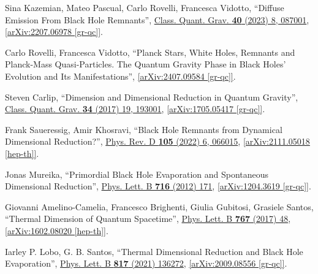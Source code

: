 \documentclass[12pt,preprintnumbers, floatfix, preprintnumbers, letterpaper, superscriptaddress,nofootinbib]{revtex4-2}
\begin{document}
\begin{thebibliography}{99}
Sina Kazemian, Mateo Pascual, Carlo Rovelli, Francesca Vidotto, ``Diffuse Emission From Black Hole Remnants'', {\hypersetup{urlcolor=vividviolet}\href{https://iopscience.iop.org/article/10.1088/1361-6382/acc232}{Class. Quant. Grav. \textbf{40} (2023) 8, 087001}}, \href{https://arxiv.org/abs/2207.06978}{[arXiv:2207.06978 [gr-qc]]}.

Carlo Rovelli, Francesca Vidotto, ``Planck Stars, White Holes, Remnants and Planck-Mass Quasi-Particles. The Quantum Gravity Phase in Black Holes’ Evolution and Its Manifestations'', \href{https://arxiv.org/abs/2407.09584}{[arXiv:2407.09584 [gr-qc]]}.


Steven Carlip, ``Dimension and Dimensional Reduction in Quantum Gravity'', {\hypersetup{urlcolor=vividviolet}\href{https://iopscience.iop.org/article/10.1088/1361-6382/aa8535}{Class. Quant. Grav. \textbf{34} (2017) 19, 193001}}, \href{https://arxiv.org/abs/1705.05417}{[arXiv:1705.05417 [gr-qc]]}.

Frank Saueressig, Amir Khosravi, ``Black Hole Remnants from Dynamical Dimensional Reduction?'', {\hypersetup{urlcolor=vividviolet}\href{https://journals.aps.org/prd/abstract/10.1103/PhysRevD.105.066015}{Phys. Rev. D \textbf{105} (2022) 6, 066015}}, \href{https://arxiv.org/abs/2111.05018}{[arXiv:2111.05018 [hep-th]]}.


Jonas Mureika, ``Primordial Black Hole Evaporation and Spontaneous Dimensional Reduction'', {\hypersetup{urlcolor=vividviolet}\href{https://www.sciencedirect.com/science/article/pii/S0370269312008660?via\%3Dihub}{Phys. Lett. B \textbf{716} (2012) 171}}, \href{https://arxiv.org/abs/1204.3619}{[arXiv:1204.3619 [gr-qc]]}.

Giovanni Amelino-Camelia, Francesco Brighenti, Giulia Gubitosi, Grasiele Santos, ``Thermal Dimension of Quantum Spacetime'',  {\hypersetup{urlcolor=vividviolet}\href{https://www.sciencedirect.com/science/article/pii/S0370269317300680?via\%3Dihub}{Phys. Lett. B \textbf{767} (2017) 48}}, \href{https://arxiv.org/abs/1602.08020}{[arXiv:1602.08020 [hep-th]]}.

Iarley  P. Lobo, G. B. Santos, ``Thermal Dimensional Reduction and Black Hole Evaporation'', {\hypersetup{urlcolor=vividviolet}\href{https://linkinghub.elsevier.com/retrieve/pii/S0370269321002124}{Phys. Lett. B \textbf{817} (2021) 136272}}, \href{https://arxiv.org/abs/2009.08556}{[arXiv:2009.08556 [gr-qc]]}.


\end{thebibliography}
\end{document}
